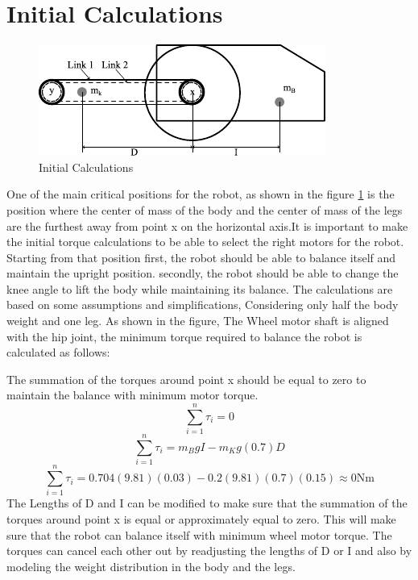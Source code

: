 \section{Initial Calculations}
\begin{figure}[h]
	\centering
	\includegraphics[width=0.7\linewidth]{Initial Calculations}
	\caption[Initial Calculations]{Initial Calculations}
	\label{fig:initialcalculations}
\end{figure}
One of the main critical positions for the robot, as shown in the figure \ref{fig:initialcalculations} is the position where the center of mass of the body and the center of mass of the legs are the furthest away from point x on the horizontal axis.It is important to make the initial torque calculations to be able to select the right motors for the robot.
Starting from that position first, the robot should be able to balance itself and maintain the upright position.
secondly, the robot should be able to change the knee angle to lift the body while maintaining its balance.
The calculations are based on some assumptions and simplifications, Considering only half the body weight and one leg.
As shown in the figure, The Wheel motor shaft is aligned with the hip joint, the minimum torque required to balance the robot is calculated as follows:

The summation of the torques around point x should be equal to zero to maintain the balance with minimum motor torque.
\begin{equation}
	\sum_{i=1}^{n} \tau_{i}=0
\end{equation}
\begin{equation}
	\sum_{i=1}^{n} \tau_{i}=m_{B}gI-m_{K}g(0.7)D
\end{equation}
\begin{equation}
	\sum_{i=1}^{n} \tau_{i}=0.704(9.81)(0.03)-0.2(9.81)(0.7)(0.15)\approx0 \mathrm{Nm}
\end{equation}
The Lengths of D and I can be modified to make sure that the summation of the torques around point x is equal or approximately equal to zero.
This will make sure that the robot can balance itself with minimum wheel motor torque.
The torques can cancel each other out by readjusting the lengths of D or I and also by modeling the weight distribution in the body and the legs.


